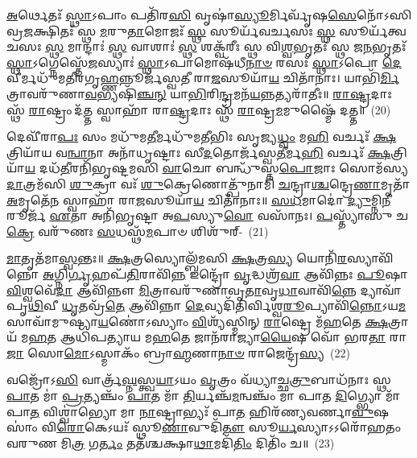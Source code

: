 {\anuvakamend[{\-\ul{𑌪}\-\-\ul{𑌶𑍂}\-𑌨𑌾𑌂 𑌵𑍍𑌰𑌾\-\ul{𑌤𑌾𑌃} 𑌪𑌞𑍍𑌚᳴𑌵𑌿𑍞𑌶𑌤𑌿𑌶𑍍𑌚}]}%

\-\ul{𑌅}\-𑌰𑍍𑌥𑍇𑌤𑌃᳴ \ul{𑌸𑍍𑌥𑌾}\-\-𑌽𑌪𑌾𑌂 𑌪𑌤𑌿᳴𑌰\-\ul{𑌸𑌿} 𑌵𑍃𑌷𑌾॑\-\ul{𑌸𑍍𑌯𑍂}\-𑌰𑍍𑌮𑌿𑌰𑍍𑌵𑍃᳴𑌷\-\ul{𑌸𑍇}\-𑌨𑍋᳴\-𑌽𑌸𑌿 𑌵𑍍𑌰\-\ul{𑌜}\-𑌕𑍍𑌷𑌿𑌤𑌃᳴ 𑌸𑍍𑌥 \ul{𑌮}\-𑌰𑍁\-\ul{𑌤𑌾}\-𑌮𑍋𑌜𑌃᳴ \ul{𑌸𑍍𑌥} 𑌸𑍂𑌰𑍍𑌯᳴𑌵𑌰𑍍𑌚𑌸𑌃 \ul{𑌸𑍍𑌥} 𑌸𑍂𑌰𑍍𑌯᳴𑌤𑍍𑌵𑌚𑌸𑌃 \ul{𑌸𑍍𑌥} 𑌮𑌾𑌨𑍍𑌦𑌾𑌃॑ \ul{𑌸𑍍𑌥} 𑌵𑌾𑌶𑌾𑌃॑ \ul{𑌸𑍍𑌥} 𑌶𑌕𑍍𑌵᳴𑌰𑍀𑌃 𑌸𑍍𑌥 𑌵𑌿\-\ul{𑌶𑍍𑌵}\-𑌭𑍃𑌤𑌃᳴ 𑌸𑍍𑌥 𑌜\-\ul{𑌨}\-𑌭𑍃𑌤𑌃᳴ \ul{𑌸𑍍𑌥𑌾}\-\-𑌽𑌗𑍍𑌨𑍇𑌸𑍍𑌤𑍇᳴\-\ul{𑌜}\-𑌸𑍍𑌯𑌾𑌃॑ \ul{𑌸𑍍𑌥𑌾}\-\-𑌽𑌪𑌾𑌮𑍋𑌷᳴𑌧𑍀\-\ul{𑌨𑌾}\-\-\ul{𑍞} 𑌰𑌸𑌃᳴ \ul{𑌸𑍍𑌥𑌾}\-\-𑌽𑌪𑍋 \ul{𑌦𑍇}\-𑌵𑍀𑌰𑍍𑌮𑌧𑍁᳴𑌮𑌤𑍀𑌰𑌗𑍃\-\ul{𑌹𑍍𑌣}\-𑌨𑍍𑌨𑍂𑌰𑍍𑌜᳴𑌸𑍍𑌵𑌤𑍀 𑌰𑌾\-\ul{𑌜}\-𑌸𑍂𑌯𑌾᳴\-\ul{𑌯} 𑌚𑌿𑌤𑌾᳴𑌨𑌾𑌃। 𑌯𑌾𑌭𑌿᳴\-\ul{𑌰𑍍𑌮𑌿}\-𑌤𑍍𑌰𑌾𑌵𑌰𑍁᳴𑌣𑌾\-\ul{𑌵}\-𑌭𑍍𑌯𑌷𑌿᳴\-\ul{𑌞𑍍𑌚}\-\-\ul{𑌨𑍍} 𑌯𑌾\-\ul{𑌭𑌿}\-𑌰𑌿\-\ul{𑌨𑍍𑌦𑍍𑌰}\-𑌮𑌨᳴\-\ul{𑌯}\-𑌨𑍍𑌨𑌤𑍍𑌯𑌰𑌾᳴𑌤𑍀𑌃॥ \ul{𑌰𑌾}\-\-\ul{𑌷𑍍𑌟𑍍𑌰}\-𑌦𑌾𑌃 𑌸𑍍𑌥᳴ \ul{𑌰𑌾}\-𑌷𑍍𑌟𑍍𑌰𑌂 𑌦᳴\-\ul{𑌤𑍍𑌤} 𑌸𑍍𑌵𑌾𑌹𑌾᳴ 𑌰𑌾\-\ul{𑌷𑍍𑌟𑍍𑌰}\-𑌦𑌾𑌃 𑌸𑍍𑌥᳴ \ul{𑌰𑌾}\-𑌷𑍍𑌟𑍍𑌰\-\ul{𑌮}\-𑌮𑍁𑌷𑍍𑌮𑍈᳴ 𑌦𑌤𑍍𑌤॥~(20)

{\anuvakamend[{𑌅𑌤𑍍𑌯𑍇𑌕𑌾᳴\-𑌦𑌶 𑌚}]}%

𑌦𑍇𑌵𑍀᳴𑌰𑌾\-\ul{𑌪𑌃} 𑌸𑌂 𑌮𑌧𑍁᳴𑌮\-\ul{𑌤𑍀}\-𑌰𑍍𑌮𑌧𑍁᳴𑌮𑌤𑍀𑌭𑌿𑌃 𑌸𑍃𑌜𑍍𑌯\-\ul{𑌧𑍍𑌵𑌂} 𑌮\-\ul{𑌹𑌿} 𑌵𑌰𑍍𑌚𑌃᳴ \ul{𑌕𑍍𑌷}\-𑌤𑍍𑌰𑌿𑌯𑌾᳴𑌯 𑌵\-\ul{𑌨𑍍𑌵𑌾}\-𑌨𑌾 𑌅𑌨𑌾᳴𑌧𑍃𑌷𑍍𑌟𑌾𑌃 𑌸𑍀\-\ul{𑌦}\-𑌤𑍋𑌰𑍍𑌜᳴𑌸𑍍𑌵\-\ul{𑌤𑍀}\-𑌰𑍍𑌮\-\ul{𑌹𑌿} 𑌵𑌰𑍍𑌚𑌃᳴ \ul{𑌕𑍍𑌷}\-𑌤𑍍𑌰𑌿𑌯𑌾᳴\-\ul{𑌯} 𑌦𑌧᳴\-\ul{𑌤𑍀}\-𑌰𑌨𑌿᳴𑌭𑍃𑌷𑍍𑌟𑌮𑌸𑌿 \ul{𑌵𑌾}\-𑌚𑍋 𑌬𑌨𑍍𑌧𑍁᳴𑌸𑍍𑌤\-\ul{𑌪𑍋}\-𑌜𑌾𑌃 𑌸𑍋𑌮᳴𑌸𑍍𑌯 \ul{𑌦𑌾}\-𑌤𑍍𑌰𑌮᳴𑌸𑌿 \ul{𑌶𑍁}\-𑌕𑍍𑌰𑌾 𑌵𑌃᳴ \ul{𑌶𑍁}\-𑌕𑍍𑌰𑍇𑌣𑍋𑌤𑍍𑌪𑍁᳴𑌨𑌾𑌮𑌿 \ul{𑌚}\-𑌨𑍍𑌦𑍍𑌰𑌾\-\ul{𑌶𑍍𑌚}\-𑌨𑍍𑌦𑍍𑌰𑍇\-\ul{𑌣𑌾}\-𑌮𑍃𑌤𑌾᳴ \ul{𑌅}\-𑌮𑍃𑌤𑍇᳴\-\ul{𑌨} 𑌸𑍍𑌵𑌾𑌹𑌾᳴ 𑌰𑌾\-\ul{𑌜}\-𑌸𑍂𑌯𑌾᳴\-\ul{𑌯} 𑌚𑌿𑌤𑌾᳴𑌨𑌾𑌃॥ \ul{𑌸}\-\-\ul{𑌧}\-𑌮𑌾𑌦𑍋॑ \ul{𑌦𑍍𑌯𑍁}\-𑌮𑍍𑌨𑌿\-\ul{𑌨𑍀}\-𑌰𑍂𑌰𑍍𑌜᳴ \ul{𑌏}\-𑌤𑌾 𑌅𑌨𑌿᳴𑌭𑍃𑌷𑍍𑌟𑌾 𑌅\-\ul{𑌪}\-𑌸𑍍𑌯𑍁\-\ul{𑌵𑍋} 𑌵𑌸𑌾᳴𑌨𑌃। \ul{𑌪}\-𑌸𑍍𑌤𑍍𑌯𑌾᳴𑌸𑍁 𑌚\-\ul{𑌕𑍍𑌰𑍇} 𑌵𑌰𑍁᳴𑌣𑌃 \ul{𑌸}\-𑌧𑌸𑍍𑌥᳴\-\ul{𑌮}\-𑌪𑌾𑍞 𑌶𑌿𑌶𑍁᳴𑌰𑍍-~(21)

\-\ul{𑌮𑌾}\-𑌤𑍃𑌤᳴𑌮𑌾\-\ul{𑌸𑍍𑌵}\-𑌨𑍍𑌤𑌃॥ \ul{𑌕𑍍𑌷}\-𑌤𑍍𑌰𑌸𑍍𑌯𑍋𑌲𑍍𑌬᳴𑌮𑌸𑌿 \ul{𑌕𑍍𑌷}\-𑌤𑍍𑌰\-\ul{𑌸𑍍𑌯} 𑌯𑍋𑌨𑌿᳴\-\ul{𑌰}\-𑌸𑍍𑌯𑌾𑌵𑌿᳴𑌨𑍍𑌨𑍋 \ul{𑌅}\-𑌗𑍍𑌨𑌿\-\ul{𑌰𑍍𑌗𑍃}\-𑌹𑌪᳴\-\ul{𑌤𑌿}\-𑌰𑌾𑌵𑌿᳴\-\ul{𑌨𑍍𑌨} 𑌇𑌨𑍍𑌦𑍍𑌰𑍋᳴ \ul{𑌵𑍃}\-𑌦𑍍𑌧𑌶𑍍𑌰᳴\-\ul{𑌵𑌾} 𑌆𑌵𑌿᳴𑌨𑍍𑌨𑌃 \ul{𑌪𑍂}\-𑌷𑌾 \ul{𑌵𑌿}\-𑌶𑍍𑌵𑌵𑍇᳴\-\ul{𑌦𑌾} 𑌆𑌵𑌿᳴𑌨𑍍𑌨𑍗 \ul{𑌮𑌿}\-𑌤𑍍𑌰𑌾𑌵𑌰𑍁᳴𑌣𑌾𑌵𑍃\-\ul{𑌤𑌾}\-𑌵𑍃\-\ul{𑌧𑌾}\-𑌵𑌾𑌵𑌿᳴\-\ul{𑌨𑍍𑌨𑍇} 𑌦𑍍𑌯𑌾𑌵𑌾᳴𑌪𑍃\-\ul{𑌥𑌿}\-𑌵𑍀 \ul{𑌧𑍃}\-𑌤𑌵𑍍𑌰᳴\-\ul{𑌤𑍇} 𑌆𑌵𑌿᳴𑌨𑍍𑌨𑌾 \ul{𑌦𑍇}\-𑌵𑍍𑌯𑌦𑌿᳴𑌤𑌿𑌰𑍍𑌵𑌿𑌶𑍍𑌵\-\ul{𑌰𑍂}\-𑌪𑍍𑌯𑌾𑌵𑌿᳴\-\ul{𑌨𑍍𑌨𑍋}\-\-𑌽𑌯\-\ul{𑌮}\-𑌸𑌾𑌵𑌾᳴𑌮𑍁𑌷𑍍𑌯𑌾\-\ul{𑌯}\-𑌣𑍋॑\-𑌽𑌸𑍍𑌯𑌾𑌂 \ul{𑌵𑌿}\-𑌶𑍍𑌯᳴𑌸𑍍𑌮𑌿𑌨𑍍 \ul{𑌰𑌾}\-𑌷𑍍𑌟𑍍𑌰𑍇 𑌮᳴\-\ul{𑌹}\-𑌤𑍇 \ul{𑌕𑍍𑌷}\-𑌤𑍍𑌰𑌾𑌯᳴ 𑌮\-\ul{𑌹}\-𑌤 𑌆𑌧𑌿᳴𑌪𑌤𑍍𑌯𑌾𑌯 𑌮\-\ul{𑌹}\-𑌤𑍇 𑌜𑌾𑌨᳴𑌰𑌾𑌜𑍍𑌯𑌾\-\ul{𑌯𑍈}\-𑌷 𑌵𑍋᳴ 𑌭𑌰\-\ul{𑌤𑌾} 𑌰𑌾\-\ul{𑌜𑌾} 𑌸𑍋\-\ul{𑌮𑍋}\-\-𑌽𑌸𑍍𑌮𑌾𑌕𑌂᳴ 𑌬𑍍𑌰𑌾\-\ul{𑌹𑍍𑌮}\-𑌣𑌾\-\ul{𑌨𑌾}\-\-\ul{𑍞} 𑌰𑌾𑌜𑍇𑌨𑍍𑌦𑍍𑌰᳴\-\ul{𑌸𑍍𑌯}\-~(22)

𑌵𑌜𑍍𑌰𑍋᳴\-𑌽\-\ul{𑌸𑌿} 𑌵𑌾𑌰𑍍𑌤𑍍𑌰᳴\-\ul{𑌘𑍍𑌨}\-𑌸𑍍𑌤𑍍𑌵\-\ul{𑌯𑌾}\-𑌽𑌯𑌂 \ul{𑌵𑍃}\-𑌤𑍍𑌰𑌂 𑌵᳴𑌧𑍍𑌯𑌾𑌚𑍍𑌛\-\ul{𑌤𑍍𑌰𑍁}\-𑌬𑌾𑌧᳴𑌨𑌾𑌃 𑌸𑍍𑌥 \ul{𑌪𑌾}\-𑌤 𑌮𑌾॑ \ul{𑌪𑍍𑌰}\-𑌤𑍍𑌯𑌞𑍍𑌚𑌂᳴ \ul{𑌪𑌾}\-𑌤 𑌮𑌾᳴ \ul{𑌤𑌿}\-𑌰𑍍𑌯𑌞𑍍𑌚᳴\-\ul{𑌮}\-𑌨𑍍𑌵𑌞𑍍𑌚𑌂᳴ 𑌮𑌾 𑌪𑌾𑌤 \ul{𑌦𑌿}\-𑌗𑍍𑌭𑍍𑌯𑍋 𑌮𑌾᳴ 𑌪𑌾\-\ul{𑌤} 𑌵𑌿𑌶𑍍𑌵𑌾॑𑌭𑍍𑌯𑍋 𑌮𑌾 \ul{𑌨𑌾}\-𑌷𑍍𑌟𑍍𑌰𑌾𑌭𑍍𑌯𑌃᳴ 𑌪𑌾\-\ul{𑌤} 𑌹𑌿𑌰᳴𑌣𑍍𑌯𑌵𑌰𑍍𑌣𑌾\-\ul{𑌵𑍁}\-𑌷𑌸𑌾𑌂॑ 𑌵𑌿\-\ul{𑌰𑍋}\-𑌕𑍇\-𑌽𑌯𑌃᳴ 𑌸𑍍𑌥𑍂\-\ul{𑌣𑌾}\-𑌵𑍁𑌦𑌿᳴\-\ul{𑌤𑍗} 𑌸𑍂\-\ul{𑌰𑍍𑌯}\-𑌸𑍍𑌯𑌾\-𑌽\-𑌽𑌰𑍋᳴𑌹𑌤𑌂 𑌵𑌰𑍁𑌣 𑌮𑌿\-\ul{𑌤𑍍𑌰} 𑌗\-\ul{𑌰𑍍𑌤𑌂} 𑌤𑌤᳴𑌶𑍍𑌚𑌕𑍍𑌷𑌾\-\ul{𑌥𑌾}\-𑌮𑌦𑌿᳴\-\ul{𑌤𑌿𑌂} 𑌦𑌿𑌤𑌿𑌂᳴ 𑌚॥~(23)

